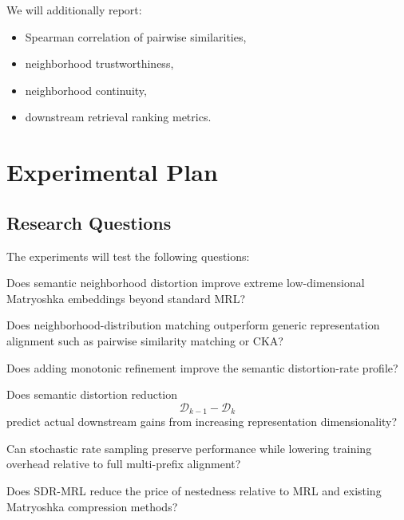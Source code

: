 \documentclass[11pt]{article}
\newcommand{\cD}{\mathcal{D}}
\begin{document}
We will additionally report:
\begin{itemize}[leftmargin=1.5em]
    \item Spearman correlation of pairwise similarities,
    \item neighborhood trustworthiness,
    \item neighborhood continuity,
    \item downstream retrieval ranking metrics.
\end{itemize}


\section{Experimental Plan}

\subsection{Research Questions}

The experiments will test the following questions:

\begin{description}[leftmargin=1.6em,style=nextline]

\item[RQ1.]
Does semantic neighborhood distortion improve extreme low-dimensional Matryoshka embeddings beyond standard MRL?

\item[RQ2.]
Does neighborhood-distribution matching outperform generic representation alignment such as pairwise similarity matching or CKA?

\item[RQ3.]
Does adding monotonic refinement improve the semantic distortion-rate profile?

\item[RQ4.]
Does semantic distortion reduction
\begin{equation}
    \cD_{k-1}-\cD_k
\end{equation}
predict actual downstream gains from increasing representation dimensionality?

\item[RQ5.]
Can stochastic rate sampling preserve performance while lowering training overhead relative to full multi-prefix alignment?

\item[RQ6.]
Does SDR-MRL reduce the price of nestedness relative to MRL and existing Matryoshka compression methods?

\end{description}
\end{document}
